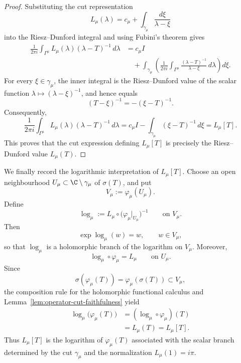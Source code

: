 \documentclass[11pt]{amsart}
\numberwithin{equation}{section}
\theoremstyle{definition}
\theoremstyle{plain}
\begin{document}
\begin{proof}



Substituting the cut representation
\[
    L_\mu(\lambda)
    =
    c_\mu+
    \int_{\gamma_\mu}\frac{d\xi}{\lambda-\xi}
\]
into the Riesz--Dunford integral and using Fubini's theorem gives
\[
\begin{aligned}
    \frac{1}{2\pi i}
    \int_{\Gamma^\mu}
         L_\mu(\lambda)(\lambda-T)^{-1}\,d\lambda
    &=
    c_\mu I
    \\
    &\quad+
    \int_{\gamma_\mu}
    \left(
    \frac{1}{2\pi i}
    \int_{\Gamma^\mu}
         \frac{(\lambda-T)^{-1}}{\lambda-\xi}\,d\lambda
    \right)d\xi.
\end{aligned}
\]
For every $\xi\in\gamma_\mu$, the inner integral is the
Riesz--Dunford value of the scalar function
$\lambda\mapsto(\lambda-\xi)^{-1}$, and hence equals
\[
    (T-\xi)^{-1}=-(\xi-T)^{-1}.
\]
Consequently,
\[
    \frac{1}{2\pi i}
    \int_{\Gamma^\mu}
         L_\mu(\lambda)(\lambda-T)^{-1}\,d\lambda
    =
    c_\mu I-
    \int_{\gamma_\mu}(\xi-T)^{-1}\,d\xi
    =
    L_\mu[T].
\]
This proves that the cut expression defining $L_\mu[T]$ is precisely
the Riesz--Dunford value $L_\mu(T)$.
\end{proof}

We finally record the logarithmic interpretation of $L_\mu[T]$.
Choose an open neighbourhood
\(
    U_\mu\subset\C\setminus\gamma_\mu
\)
of $\sigma(T)$, and put
\[
    V_\mu:=\varphi_\mu(U_\mu).
\]
Define
\[
    \log_\mu
    :=
    L_\mu\circ
    \bigl(\varphi_\mu|_{U_\mu}\bigr)^{-1}
    \qquad\text{on }V_\mu.
\]
Then
\[
    \exp\log_\mu(w)=w,
    \qquad w\in V_\mu,
\]
so that $\log_\mu$ is a holomorphic branch of the logarithm on
$V_\mu$.  Moreover,
\[
    \log_\mu\circ\varphi_\mu=L_\mu
    \qquad\text{on }U_\mu.
\]
Since
\[
    \sigma(\varphi_\mu(T))
    =
    \varphi_\mu(\sigma(T))
    \subset V_\mu,
\]
the composition rule for the holomorphic functional calculus and
Lemma~\ref{lem:operator-cut-faithfulness} yield
\[
\begin{aligned}
    \log_\mu\bigl(\varphi_\mu(T)\bigr)
    &=
    (\log_\mu\circ\varphi_\mu)(T)
    \\
    &=
    L_\mu(T)
    =
    L_\mu[T].
\end{aligned}
\]
Thus $L_\mu[T]$ is the logarithm of $\varphi_\mu(T)$ associated with
the scalar branch determined by the cut $\gamma_\mu$ and the
normalization $L_\mu(1)=i\pi$.
\end{document}
